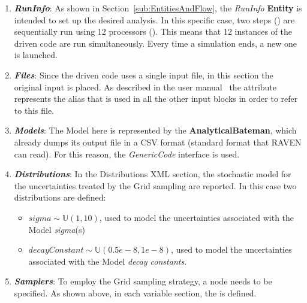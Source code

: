 \begin{enumerate}
   \item \textbf{\textit{RunInfo}}:
   As shown in Section~\ref{sub:EntitiesAndFlow}, the \textit{RunInfo} \textbf{Entity} is intended to set up the desired analysis.
   In this specific case, two steps () are sequentially run
   using 12 processors (). This means that
   12 instances of the driven code are  run simultaneously.
   Every time a simulation ends, a new one is launched.
   \item \textbf{\textit{Files}}:
   Since the driven code uses a single input file, in this section the original input is placed. As described in the user manual~\cite{RAVENuserManual}
   the attribute   represents the alias that is used in all the other input blocks in order to refer to this file.
   \item \textbf{\textit{Models}}:
 The Model here is represented by the
 \textbf{AnalyticalBateman}, which already dumps its output file in a
 CSV format (standard format that RAVEN can read). For this reason,
 the \textit{GenericCode} interface is used.
   \item \textbf{\textit{Distributions}}:
  In the Distributions XML section, the stochastic model for the
  uncertainties  treated by the Grid sampling are reported. In
  this case two distributions are defined:
  \begin{itemize}
    \item $sigma \sim \mathbb{U}(1,10)$, used to model the uncertainties
    associated with  the Model \textit{sigma}(s)
    \item  $decayConstant \sim \mathbb{U}(0.5e-8,1e-8)$,  used to
    model the uncertainties
    associated with  the Model \textit{decay constants}.
  \end{itemize}
   \item \textbf{\textit{Samplers}}:
  To employ the Grid sampling strategy, a
   node needs to be specified. As shown above, in each variable section, the   is defined.

\end{enumerate}
